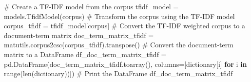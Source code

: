\documentclass[
  letterpaper,
  DIV=11,
  numbers=noendperiod]{scrreprt}
\newenvironment{Shaded}{\begin{snugshade}}{\end{snugshade}}
\newcommand{\BuiltInTok}[1]{\textcolor[rgb]{0.00,0.23,0.31}{#1}}
\newcommand{\CommentTok}[1]{\textcolor[rgb]{0.37,0.37,0.37}{#1}}
\newcommand{\ControlFlowTok}[1]{\textcolor[rgb]{0.00,0.23,0.31}{\textbf{#1}}}
\newcommand{\KeywordTok}[1]{\textcolor[rgb]{0.00,0.23,0.31}{\textbf{#1}}}
\newcommand{\NormalTok}[1]{\textcolor[rgb]{0.00,0.23,0.31}{#1}}
\newcommand{\OperatorTok}[1]{\textcolor[rgb]{0.37,0.37,0.37}{#1}}
\begin{document}
\begin{Shaded}
\begin{Highlighting}[]
\CommentTok{\# Create a TF{-}IDF model from the corpus }
\NormalTok{tfidf\_model }\OperatorTok{=}\NormalTok{ models.TfidfModel(corpus)}
\CommentTok{\# Transform the corpus using the TF{-}IDF model }
\NormalTok{corpus\_tfidf }\OperatorTok{=}\NormalTok{ tfidf\_model[corpus]}
\CommentTok{\# Convert the TF{-}IDF weighted corpus to a document{-}term matrix }
\NormalTok{doc\_term\_matrix\_tfidf }\OperatorTok{=}\NormalTok{ matutils.corpus2csc(corpus\_tfidf).transpose()}
\CommentTok{\# Convert the document{-}term matrix to a DataFrame }
\NormalTok{df\_doc\_term\_matrix\_tfidf }\OperatorTok{=}\NormalTok{ pd.DataFrame(doc\_term\_matrix\_tfidf.toarray(), }
\NormalTok{columns}\OperatorTok{=}\NormalTok{[dictionary[i] }\ControlFlowTok{for}\NormalTok{ i }\KeywordTok{in} \BuiltInTok{range}\NormalTok{(}\BuiltInTok{len}\NormalTok{(dictionary))])}
\CommentTok{\# Print the DataFrame }
\NormalTok{df\_doc\_term\_matrix\_tfidf}
\end{Highlighting}
\end{Shaded}
\end{document}
